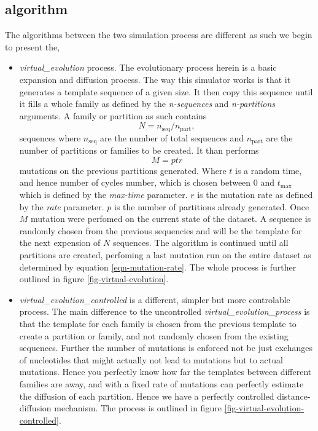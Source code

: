 \subsection{algorithm}
The algorithms between the two simulation process are different as
such we begin to present the,
\begin{itemize}
  \item \emph{virtual\_evolution} process. The evolutionary process
    herein is a basic expansion and diffusion process. The way this
    simulator works is that it generates a template sequence of a
    given size. It then copy this sequence until it fills a whole
    family as defined by the \emph{n-sequences} and
    \emph{n-partitions} arguments. A family or partition as such
    contains
    \begin{equation}
      N = n_{\mathrm{seq}}/n_{\mathrm{part}},
    \end{equation} sequences where
    $n_{\mathrm{seq}}$ are the number of total sequences and
    $n_{\mathrm{part}}$ are the number of partitions or families to be
    created. It than performs
    \begin{equation}
      M = ptr \label{eqn-mutation-rate}
    \end{equation}
    mutations on the previous partitions generated. Where $t$ is a random
    time, and hence number of cycles number, which is chosen between 0
    and $t_{\mathrm{max}}$ which is defined by the \emph{max-time}
    parameter. $r$ is the mutation rate as defined by the \emph{rate}
    parameter. $p$ is the number of partitions already generated.
    Once $M$ mutation were perfomed on the current state of the
    dataset. A sequence is randomly chosen from the previous
    sequencies and will be the template for the next expension of $N$
    sequences. The algorithm is continued until all partitions are
    created, perfoming a last mutation run on the entire dataset as
    determined by equation \ref{eqn-mutation-rate}.
    The whole process is further outlined in figure
    \ref{fig-virtual-evolution}.
  \item \emph{virtual\_evolution\_controlled} is a different, simpler
    but more controlable process. The main difference to the
    uncontrolled \emph{virtual\_evolution\_process} is that the
    template for each family is chosen from the previous template to
    create a partition or family, and not randomly chosen from the
    existing sequences. Further the number of mutations is enforced
    not be just exchanges of nucleotides that might actually not lead
    to mutations but to actual mutations. Hence you perfectly know how
    far the templates between different families are away, and with a
    fixed rate of mutations can perfectly estimate the diffusion of
    each partition. Hence we have a perfectly controlled
    distance-diffusion mechanism. The process is outlined in figure
    \ref{fig-virtual-evolution-controlled}.
\end{itemize}
